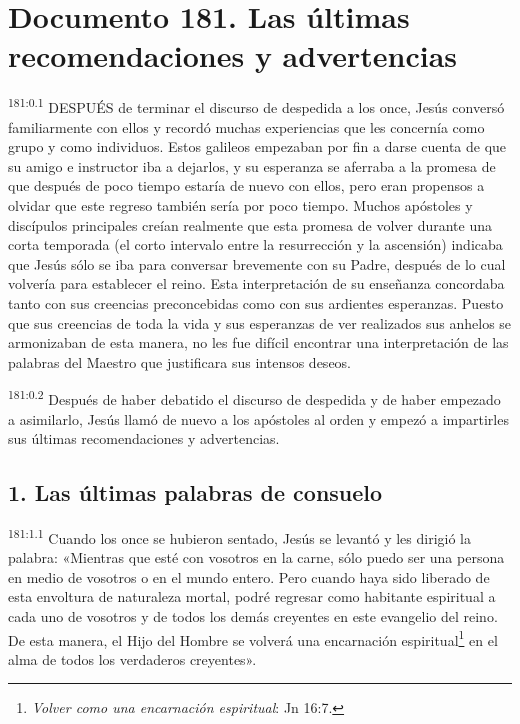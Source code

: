 \chapter{Documento 181. Las últimas recomendaciones y advertencias}
\par
\textsuperscript{181:0.1} DESPUÉS de terminar el discurso de despedida a los once, Jesús conversó familiarmente con ellos y recordó muchas experiencias que les concernía como grupo y como individuos. Estos galileos empezaban por fin a darse cuenta de que su amigo e instructor iba a dejarlos, y su esperanza se aferraba a la promesa de que después de poco tiempo estaría de nuevo con ellos, pero eran propensos a olvidar que este regreso también sería por poco tiempo. Muchos apóstoles y discípulos principales creían realmente que esta promesa de volver durante una corta temporada (el corto intervalo entre la resurrección y la ascensión) indicaba que Jesús sólo se iba para conversar brevemente con su Padre, después de lo cual volvería para establecer el reino. Esta interpretación de su enseñanza concordaba tanto con sus creencias preconcebidas como con sus ardientes esperanzas. Puesto que sus creencias de toda la vida y sus esperanzas de ver realizados sus anhelos se armonizaban de esta manera, no les fue difícil encontrar una interpretación de las palabras del Maestro que justificara sus intensos deseos.

\par
\textsuperscript{181:0.2} Después de haber debatido el discurso de despedida y de haber empezado a asimilarlo, Jesús llamó de nuevo a los apóstoles al orden y empezó a impartirles sus últimas recomendaciones y advertencias.

\section*{1. Las últimas palabras de consuelo}
\par
\textsuperscript{181:1.1} Cuando los once se hubieron sentado, Jesús se levantó y les dirigió la palabra: «Mientras que esté con vosotros en la carne, sólo puedo ser una persona en medio de vosotros o en el mundo entero. Pero cuando haya sido liberado de esta envoltura de naturaleza mortal, podré regresar como habitante espiritual a cada uno de vosotros y de todos los demás creyentes en este evangelio del reino. De esta manera, el Hijo del Hombre se volverá una encarnación espiritual\footnote{\textit{Volver como una encarnación espiritual}: Jn 16:7.} en el alma de todos los verdaderos creyentes».

